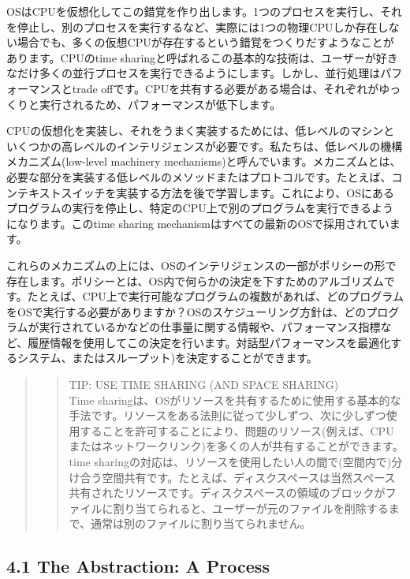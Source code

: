 OSはCPUを仮想化してこの錯覚を作り出します。1つのプロセスを実行し、それを停止し、別のプロセスを実行するなど、実際には1つの物理CPUしか存在しない場合でも、多くの仮想CPUが存在するという錯覚をつくりだすようなことがあります。CPUのtime
sharingと呼ばれるこの基本的な技術は、ユーザーが好きなだけ多くの並行プロセスを実行できるようにします。しかし、並行処理はパフォーマンスとtrade
offです。CPUを共有する必要がある場合は、それぞれがゆっくりと実行されるため、パフォーマンスが低下します。

CPUの仮想化を実装し、それをうまく実装するためには、低レベルのマシンといくつかの高レベルのインテリジェンスが必要です。私たちは、低レベルの機構メカニズム(low-level
machinery
mechanisms)と呼んでいます。メカニズムとは、必要な部分を実装する低レベルのメソッドまたはプロトコルです。たとえば、コンテキストスイッチを実装する方法を後で学習します。これにより、OSにあるプログラムの実行を停止し、特定のCPU上で別のプログラムを実行できるようになります。このtime
sharing mechanismはすべての最新のOSで採用されています。

これらのメカニズムの上には、OSのインテリジェンスの一部がポリシーの形で存在します。ポリシーとは、OS内で何らかの決定を下すためのアルゴリズムです。たとえば、CPU上で実行可能なプログラムの複数があれば、どのプログラムをOSで実行する必要がありますか？OSのスケジューリング方針は、どのプログラムが実行されているかなどの仕事量に関する情報や、パフォーマンス指標など、履歴情報を使用してこの決定を行います。対話型パフォーマンスを最適化するシステム、またはスループット)を決定することができます。

\begin{quote}
\begin{quote}
TIP: USE TIME SHARING (AND SPACE SHARING)\\
Time
sharingは、OSがリソースを共有するために使用する基本的な手法です。リソースをある法則に従って少しずつ、次に少しずつ使用することを許可することにより、問題のリソース(例えば、CPUまたはネットワークリンク)を多くの人が共有することができます。time
sharingの対応は、リソースを使用したい人の間で(空間内で)分け合う空間共有です。たとえば、ディスクスペースは当然スペース共有されたリソースです。ディスクスペースの領域のブロックがファイルに割り当てられると、ユーザーが元のファイルを削除するまで、通常は別のファイルに割り当てられません。
\end{quote}
\end{quote}

\hypertarget{the-abstraction-a-process}{%
\subsection*{4.1 The Abstraction: A
Process}\label{the-abstraction-a-process}}

